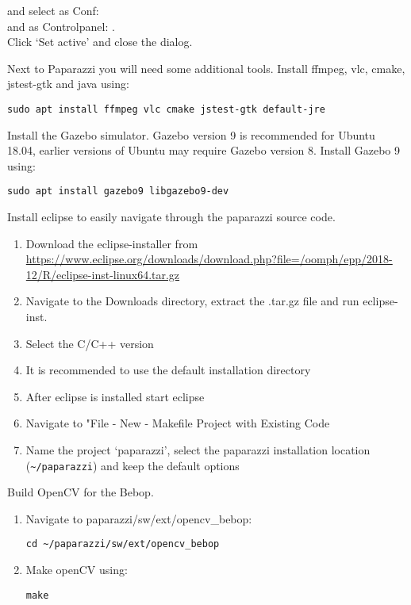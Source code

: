 \documentclass{article}
\begin{document}
\begin{enumerate}
{{and select as Conf: \\
and as Controlpanel: .\\
Click `Set active' and close the dialog.}
\item{Next to Paparazzi you will need some additional tools. Install ffmpeg, vlc, cmake, jstest-gtk and java using:
\begin{lstlisting}[style=Bash]
sudo apt install ffmpeg vlc cmake jstest-gtk default-jre
\end{lstlisting}
}
}
\item{Install the Gazebo simulator. Gazebo version 9 is recommended for Ubuntu 18.04, earlier versions of Ubuntu may require Gazebo version 8. Install Gazebo 9 using:
\begin{lstlisting}[style=Bash]
sudo apt install gazebo9 libgazebo9-dev
\end{lstlisting}
}
\item{Install eclipse to easily navigate through the paparazzi source code.
\begin{enumerate}
\item{Download the eclipse-installer from \url{https://www.eclipse.org/downloads/download.php?file=/oomph/epp/2018-12/R/eclipse-inst-linux64.tar.gz}}
\item{Navigate to the Downloads directory, extract the .tar.gz file and run eclipse-inst.}
\item{Select the C/C++ version}
\item{It is recommended to use the default installation directory}
\item{After eclipse is installed start eclipse}
\item{Navigate to "File - New - Makefile Project with Existing Code}
\item{Name the project `paparazzi', select the paparazzi installation location (\verb|~/paparazzi|) and keep the default options}
\end{enumerate}
}
\item{Build OpenCV for the Bebop.
\begin{enumerate}
\item{Navigate to paparazzi/sw/ext/opencv\_bebop:
\begin{lstlisting}[style=Bash]
cd ~/paparazzi/sw/ext/opencv_bebop
\end{lstlisting}}
\item{Make openCV using:
\begin{lstlisting}[style=Bash]
make
\end{lstlisting}}
\end{enumerate}
}
\end{enumerate}
\end{document}
